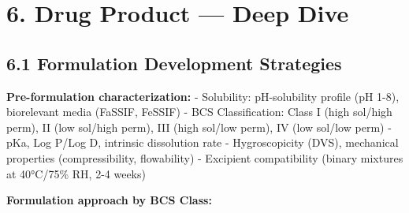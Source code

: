 \documentclass[
  11pt,
  a4paper,
]{report}
\begin{document}
\hypertarget{drug-product-deep-dive}{%
\section{6. Drug Product --- Deep Dive}\label{drug-product-deep-dive}}

\hypertarget{formulation-development-strategies}{%
\subsection{6.1 Formulation Development
Strategies}\label{formulation-development-strategies}}

\textbf{Pre-formulation characterization:} - Solubility: pH-solubility
profile (pH 1-8), biorelevant media (FaSSIF, FeSSIF) - BCS
Classification: Class I (high sol/high perm), II (low sol/high perm),
III (high sol/low perm), IV (low sol/low perm) - pKa, Log P/Log D,
intrinsic dissolution rate - Hygroscopicity (DVS), mechanical properties
(compressibility, flowability) - Excipient compatibility (binary
mixtures at 40°C/75\% RH, 2-4 weeks)

\textbf{Formulation approach by BCS Class:}
\end{document}

